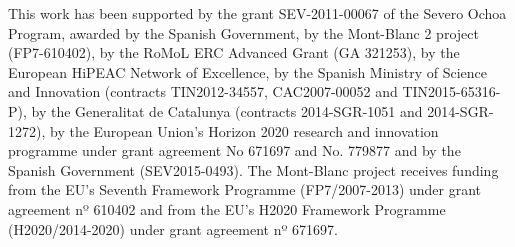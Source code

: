 





\begin{acknowledgements}
This work has been supported by the grant SEV-2011-00067 of the Severo Ochoa Program, awarded by the Spanish Government, 
by the Mont-Blanc 2 project (FP7-610402), 
by the RoMoL ERC Advanced Grant (GA 321253), 
by the European HiPEAC Network of Excellence, 
by the Spanish Ministry of Science and Innovation (contracts TIN2012-34557, CAC2007-00052 and TIN2015-65316-P), 
by the Generalitat de Catalunya (contracts 2014-SGR-1051 and 2014-SGR-1272), 
by the European Union's Horizon 2020 research and innovation programme under grant agreement No 671697 and No. 779877 and by the Spanish Government (SEV2015-0493).
The Mont-Blanc project receives funding from the EU’s Seventh Framework Programme (FP7/2007-2013) under grant agreement nº 610402 and from the EU’s H2020 Framework Programme (H2020/2014-2020) under grant agreement nº 671697. 
\end{acknowledgements}
